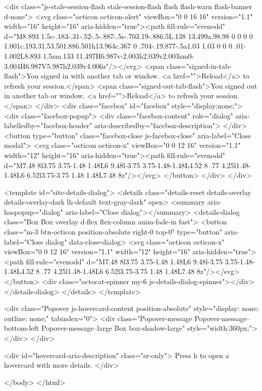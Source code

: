   <div class="js-stale-session-flash stale-session-flash flash flash-warn flash-banner d-none">
    <svg class="octicon octicon-alert" viewBox="0 0 16 16" version="1.1" width="16" height="16" aria-hidden="true"><path fill-rule="evenodd" d="M8.893 1.5c-.183-.31-.52-.5-.887-.5s-.703.19-.886.5L.138 13.499a.98.98 0 0 0 0 1.001c.193.31.53.501.886.501h13.964c.367 0 .704-.19.877-.5a1.03 1.03 0 0 0 .01-1.002L8.893 1.5zm.133 11.497H6.987v-2.003h2.039v2.003zm0-3.004H6.987V5.987h2.039v4.006z"/></svg>
    <span class="signed-in-tab-flash">You signed in with another tab or window. <a href="">Reload</a> to refresh your session.</span>
    <span class="signed-out-tab-flash">You signed out in another tab or window. <a href="">Reload</a> to refresh your session.</span>
  </div>
  <div class="facebox" id="facebox" style="display:none;">
  <div class="facebox-popup">
    <div class="facebox-content" role="dialog" aria-labelledby="facebox-header" aria-describedby="facebox-description">
    </div>
    <button type="button" class="facebox-close js-facebox-close" aria-label="Close modal">
      <svg class="octicon octicon-x" viewBox="0 0 12 16" version="1.1" width="12" height="16" aria-hidden="true"><path fill-rule="evenodd" d="M7.48 8l3.75 3.75-1.48 1.48L6 9.48l-3.75 3.75-1.48-1.48L4.52 8 .77 4.25l1.48-1.48L6 6.52l3.75-3.75 1.48 1.48L7.48 8z"/></svg>
    </button>
  </div>
</div>

  <template id="site-details-dialog">
  <details class="details-reset details-overlay details-overlay-dark lh-default text-gray-dark" open>
    <summary aria-haspopup="dialog" aria-label="Close dialog"></summary>
    <details-dialog class="Box Box--overlay d-flex flex-column anim-fade-in fast">
      <button class="m-3 btn-octicon position-absolute right-0 top-0" type="button" aria-label="Close dialog" data-close-dialog>
        <svg class="octicon octicon-x" viewBox="0 0 12 16" version="1.1" width="12" height="16" aria-hidden="true"><path fill-rule="evenodd" d="M7.48 8l3.75 3.75-1.48 1.48L6 9.48l-3.75 3.75-1.48-1.48L4.52 8 .77 4.25l1.48-1.48L6 6.52l3.75-3.75 1.48 1.48L7.48 8z"/></svg>
      </button>
      <div class="octocat-spinner my-6 js-details-dialog-spinner"></div>
    </details-dialog>
  </details>
</template>

  <div class="Popover js-hovercard-content position-absolute" style="display: none; outline: none;" tabindex="0">
  <div class="Popover-message Popover-message--bottom-left Popover-message--large Box box-shadow-large" style="width:360px;">
  </div>
</div>

<div id="hovercard-aria-description" class="sr-only">
  Press h to open a hovercard with more details.
</div>


  </body>
</html>

